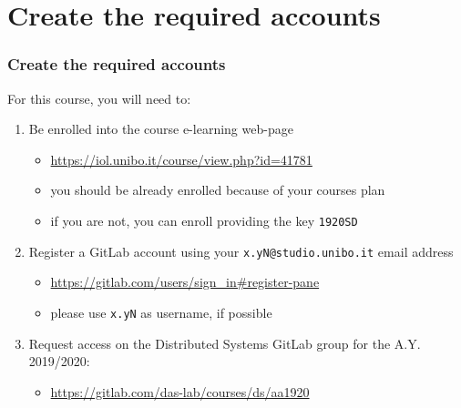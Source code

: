 \documentclass[handout]{beamer}\mode<presentation>{\usetheme{AMSCesenaPurpleAndGold}}
\begin{document}
\section{Create the required accounts}

\begin{frame}\label{configure-accounts}
\frametitle{Create the required accounts}
    
    For this course, you will need to:
    \begin{enumerate}
        \item Be enrolled into the course e-learning web-page
        \begin{itemize}
            \item \url{https://iol.unibo.it/course/view.php?id=41781}
            \item you should be already enrolled because of your courses plan
            \item if you are not, you can enroll providing the key \alert{\texttt{1920SD}}
        \end{itemize}
        
        \item Register a GitLab account using your \alert{\texttt{x.yN@studio.unibo.it}} email address
        \begin{itemize}
            \item \url{https://gitlab.com/users/sign_in\#register-pane}
            \item please use \texttt{x.yN} as username, if possible
        \end{itemize}
        
        
        \item Request access on the Distributed Systems GitLab group for the A.Y. 2019/2020:
        \begin{itemize}
            \item \url{https://gitlab.com/das-lab/courses/ds/aa1920}
        \end{itemize}
        
    \end{enumerate}
    
\end{frame}
\end{document}
